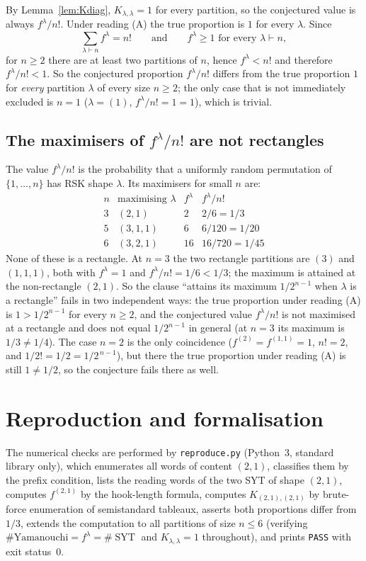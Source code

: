 \documentclass[11pt]{article}
\theoremstyle{definition}
\theoremstyle{remark}
\DeclareMathOperator{\SYT}{SYT}
\begin{document}
By Lemma~\ref{lem:Kdiag}, $K_{\lambda,\lambda}=1$ for every partition, so the
conjectured value is always $f^\lambda/n!$. Under reading (A) the true
proportion is $1$ for every $\lambda$. Since
\[
\sum_{\lambda\vdash n} f^\lambda=n!
\qquad\text{and}\qquad
f^\lambda\ge 1 \text{ for every } \lambda\vdash n,
\]
for $n\ge2$ there are at least two partitions of $n$, hence $f^\lambda<n!$ and
therefore $f^\lambda/n!<1$. So the conjectured proportion $f^\lambda/n!$
differs from the true proportion $1$ for \emph{every} partition $\lambda$ of
every size $n\ge2$; the only case that is not immediately excluded is $n=1$
($\lambda=(1)$, $f^\lambda/n!=1=1$), which is trivial.

\subsection{The maximisers of $f^\lambda/n!$ are not rectangles}

The value $f^\lambda/n!$ is the probability that a uniformly random permutation
of $\{1,\dots,n\}$ has RSK shape $\lambda$. Its maximisers for small $n$ are:
\[
\begin{array}{c|c|c|c}
n & \text{maximising } \lambda & f^\lambda & f^\lambda/n!\\
\hline
3 & (2,1) & 2 & 2/6=1/3\\
5 & (3,1,1) & 6 & 6/120=1/20\\
6 & (3,2,1) & 16 & 16/720=1/45
\end{array}
\]
None of these is a rectangle. At $n=3$ the two rectangle partitions are
$(3)$ and $(1,1,1)$, both with $f^\lambda=1$ and $f^\lambda/n!=1/6<1/3$; the
maximum is attained at the non-rectangle $(2,1)$. So the clause ``attains its
maximum $1/2^{n-1}$ when $\lambda$ is a rectangle'' fails in two independent
ways: the true proportion under reading (A) is $1>1/2^{n-1}$ for every $n\ge2$,
and the conjectured value $f^\lambda/n!$ is not maximised at a rectangle and
does not equal $1/2^{n-1}$ in general (at $n=3$ its maximum is $1/3\ne1/4$).
The case $n=2$ is the only coincidence ($f^{(2)}=f^{(1,1)}=1$, $n!=2$, and
$1/2!=1/2=1/2^{\,n-1}$), but there the true proportion under reading (A) is
still $1\ne1/2$, so the conjecture fails there as well.

\section{Reproduction and formalisation}

The numerical checks are performed by \texttt{reproduce.py} (Python~3,
standard library only), which enumerates all words of content $(2,1)$,
classifies them by the prefix condition, lists the reading words of the two
SYT of shape $(2,1)$, computes $f^{(2,1)}$ by the hook-length formula, computes
$K_{(2,1),(2,1)}$ by brute-force enumeration of semistandard tableaux, asserts
both proportions differ from $1/3$, extends the computation to all partitions
of size $n\le6$ (verifying $\#\text{Yamanouchi}=f^\lambda=\#\SYT$ and
$K_{\lambda,\lambda}=1$ throughout), and prints \texttt{PASS} with exit
status~$0$.
\end{document}
